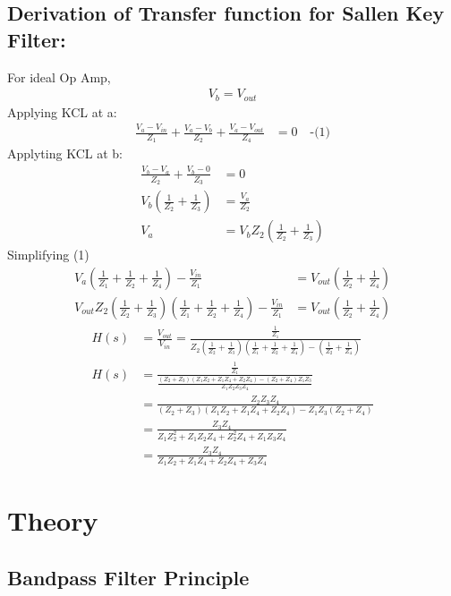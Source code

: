 \documentclass{article}
\begin{document}
\subsection*{Derivation of Transfer function for Sallen Key Filter:\\}
For ideal Op Amp,
\begin{align*}
V_b = V_{out}
\end{align*}
Applying KCL at a:
\begin{align*}
\frac{V_a - V_{in}}{Z_1} + \frac{V_a-V_b}{Z_2} + \frac{V_a-V_{out}}{Z_4} &= 0 \quad \text{-(1)}
\end{align*}
Applyting KCL at b:
\begin{align*}
\frac{V_b-V_a}{Z_2} + \frac{V_b-0}{Z_3} &= 0 \\
V_b\left(\frac{1}{Z_2} + \frac{1}{Z_3}\right) &= \frac{V_a}{Z_2} \\
V_a &= V_b Z_2\left(\frac{1}{Z_2} + \frac{1}{Z_3}\right)
\end{align*}
Simplifying (1)
\begin{align*}
V_a\left(\frac{1}{Z_1} + \frac{1}{Z_2} + \frac{1}{Z_4}\right) - \frac{V_{in}}{Z_1} &= V_{out}\left(\frac{1}{Z_2} + \frac{1}{Z_4}\right) \\
V_{out} Z_2\left(\frac{1}{Z_2} + \frac{1}{Z_3}\right)\left(\frac{1}{Z_1} + \frac{1}{Z_2} + \frac{1}{Z_4}\right) - \frac{V_{in}}{Z_1} &= V_{out}\left(\frac{1}{Z_2} + \frac{1}{Z_4}\right) 
\end{align*}
\begin{align*}
H(s) &= \frac{V_{out}}{V_{in}} = \frac{\frac{1}{Z_1}}{Z_2\left(\frac{1}{Z_2} + \frac{1}{Z_3}\right)\left(\frac{1}{Z_1} + \frac{1}{Z_2} + \frac{1}{Z_4}\right) - \left(\frac{1}{Z_2} + \frac{1}{Z_4}\right)} \\
H(s) &= \frac{\frac{1}{Z_1}}{\frac{(Z_2+Z_3)(Z_1Z_2+Z_1Z_4+Z_2Z_4) - (Z_2+Z_4)Z_1Z_3}{Z_1Z_2Z_3Z_4}} \\
 &= \frac{Z_2Z_3Z_4}{(Z_2+Z_3)(Z_1Z_2+Z_1Z_4+Z_2Z_4) - Z_1Z_3(Z_2+Z_4)} \\
 &= \frac{Z_3Z_4}{Z_1Z_2^2 + Z_1Z_2Z_4 + Z_2^2Z_4 + Z_1Z_3Z_4} \\
 &= \frac{Z_3Z_4}{Z_1Z_2 + Z_1Z_4 + Z_2Z_4 + Z_3Z_4}
\end{align*}

\section*{Theory}

\subsection*{Bandpass Filter Principle}
\end{document}
